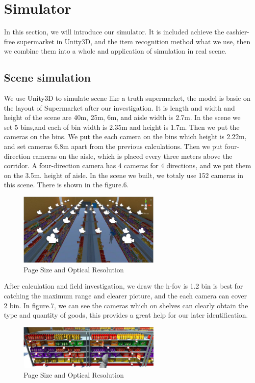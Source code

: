 \section{Simulator}

In this section, we will introduce our simulator.
It is included achieve the cashier-free supermarket in Unity3D, and the item recognition method what we use, then we combine them into a whole and application of simulation in real scene.

\subsection{Scene simulation}

We use Unity3D to simulate scene like a truth supermarket, the model is basic on the layout of Supermarket after our investigation.
It is length and width and height of the scene are 40m, 25m, 6m, and aisle width is 2.7m.
In the scene we set 5 bins,and each of bin width is 2.35m and height is 1.7m.
Then we put the cameras on the bins. 
We put the each camera on the bins which height is 2.22m, and set cameras 6.8m apart from the previous calculations.
Then we put four-direction cameras on the aisle, which is placed every three meters above the corridor. 
A four-direction camera has 4 cameras for 4 directions, and we put them on the 3.5m. height of aisle. 
In the scene we built, we totaly use 152 cameras in this scene.
There is shown in the figure.6.
\begin{figure}[htbp]
\centerline{\includegraphics[width=7cm,scale=0.8]{supermarket.jpg}}
\caption{Page Size and Optical Resolution}
\label{fig}
\end{figure}

After calculation and field investigation, we draw the h-fov is 1.2 bin is best for catching the maximum range and clearer picture, and the each camera can cover 2 bin.
In figure.7, we can see the cameras which on shelves can clearly obtain the type and quantity of goods, this provides a great help for our later identification.
\begin{figure}[htbp]
\centerline{\includegraphics[width=7cm,scale=0.8]{shelves.jpg}}
\caption{Page Size and Optical Resolution}
\label{fig}
\end{figure}


